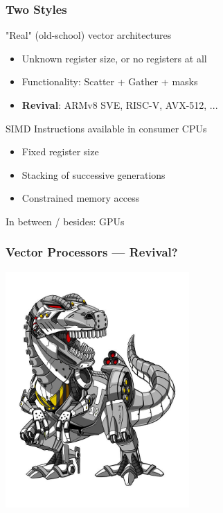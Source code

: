 \documentclass[xcolor={x11names,svgnames}]{beamer}
\begin{document}

\begin{frame}
  \frametitle{Two Styles}

\begin{exampleblock}{"Real" (old-school) vector architectures}
  \begin{itemize}
  \item Unknown register size, or no registers at all
  \item Functionality: Scatter + Gather + masks
  \item \textbf{\alert{Revival}}: ARMv8 SVE, RISC-V, AVX-512, ...
  \end{itemize}
\end{exampleblock}

\begin{alertblock}{SIMD Instructions available in consumer CPUs}
  \begin{itemize}
  \item Fixed register size
  \item Stacking of successive generations
  \item Constrained memory access
  \end{itemize}
\end{alertblock}

In between / besides: GPUs
\end{frame}


\begin{frame}
  \frametitle{Vector Processors --- Revival?}
  \centering
  \includegraphics[height=9cm]{robodino.jpg}

\end{frame}
\end{document}
